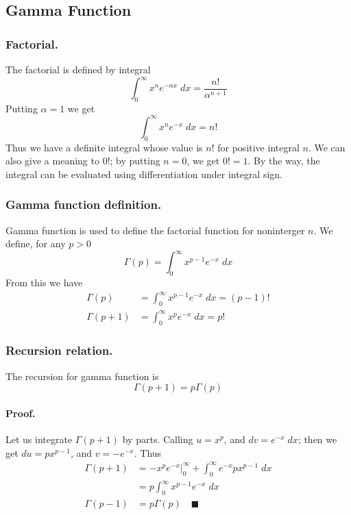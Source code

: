 \documentclass[../../main.tex]{subfiles}
\begin{document}
\subsection{Gamma Function}
\subsubsection{Factorial.} The factorial is defined by integral
\begin{equation*}
    \int_{0}^{\infty} x^ne^{-\alpha x}\;dx=\frac{n!}{\alpha^{n+1}}
\end{equation*}
Putting $\alpha=1$ we get 
\begin{equation*}
    \int_{0}^{\infty} x^ne^{-x}\;dx=n!
\end{equation*}
Thus we have a definite integral whose value is $n!$ for positive integral $n$. We can also give a meaning to $0!$; by putting $n=0$, we get $0!=1$. By the way, the integral can be evaluated using differentiation under integral sign. 

\subsubsection{Gamma function definition.} Gamma function is used to define the factorial function for noninterger $n$. We define, for any $p > 0$
\begin{equation*}
    \Gamma(p)=\int_{0}^{\infty} x^{p-1}e^{-  x}\;dx
\end{equation*}
From this we have 
\begin{align*}
    \Gamma(p)&=\int_{0}^{\infty} x^{p-1}e^{-  x}\;dx=(p-1)!\\
    \Gamma(p+1)&=\int_{0}^{\infty} x^{p}e^{-  x}\;dx=p!
\end{align*}

\subsubsection{Recursion relation.} The recursion for gamma function is 
\begin{equation*}
    \Gamma(p+1)=p\Gamma(p)
\end{equation*}

\paragraph{Proof.} Let us integrate $\Gamma(p+1)$ by parts. Calling $u=x^p$, and $ dv=e^{-x}\;dx$; then we get $du=px^{p-1}$, and $v=-e^{-x}$. Thus 
\begin{align*}
    \Gamma(p+1)&=-x^pe^{-x}\bigg|_0^{\infty}+\int_{0}^{\infty}e^{-x}px^{p-1}\;dx\\
    &=p\int_{0}^{\infty}x^{p-1}e^{-x}\;dx\\
    \Gamma(p-1)&=p\Gamma(p)\quad\blacksquare
\end{align*}
\end{document}
